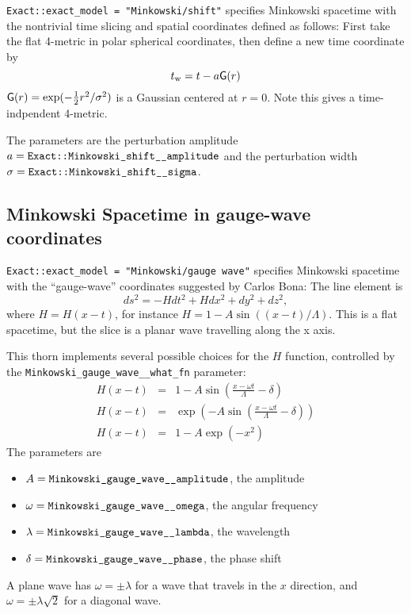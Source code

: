 \verb|Exact::exact_model = "Minkowski/shift"| specifies Minkowski spacetime
with the nontrivial time slicing and spatial coordinates defined as
follows:  First take the flat 4-metric in polar spherical coordinates,
then define a new time coordinate by
\begin{equation}
t_{{\rm w}} = t - a {\sf G}(r)
\end{equation}
${\sf G}(r) = \exp(-{\textstyle \frac{1}{2}} r^2/\sigma^2)$ is a Gaussian centered at $r=0$.
Note this gives a time-indpendent 4-metric.

The parameters are the perturbation amplitude
$a = \verb|Exact::Minkowski_shift__amplitude|$
and the perturbation width $\sigma = \verb|Exact::Minkowski_shift__sigma|$.


\subsection{Minkowski Spacetime in gauge-wave coordinates}

\verb|Exact::exact_model = "Minkowski/gauge wave"| specifies Minkowski
spacetime with the ``gauge-wave'' coordinates suggested by Carlos Bona:
The line element is
\begin{equation}
ds^2=-H dt^2 +Hdx^2+dy^2+dz^2,
\end{equation}
where $H=H(x-t)$, for instance $H=1-A\sin\left((x-t)/\Lambda\right)$.
This is a flat spacetime, but the slice is a planar wave travelling
along the x axis.

This thorn implements several possible choices for the $H$ function,
controlled by the \verb|Minkowski_gauge_wave__what_fn| parameter:
\begin{eqnarray}
H(x-t)	&=& 1 - A \sin \left(\frac{x-\omega t}{\Lambda} - \delta\right)	\\
H(x-t)	&=& \exp \left(- A \sin \left(\frac{x-\omega t}{\Lambda}
                                      - \delta\right)\right)		\\
H(x-t)	&=& 1 - A \exp(-x^2)						%
\end{eqnarray}
The parameters are
\begin{itemize}
\item	$A = \verb|Minkowski_gauge_wave__amplitude|$, the amplitude
\item	$\omega = \verb|Minkowski_gauge_wave__omega|$, the angular frequency
\item	$\lambda = \verb|Minkowski_gauge_wave__lambda|$, the wavelength
\item	$\delta = \verb|Minkowski_gauge_wave__phase|$, the phase shift
\end{itemize}
A plane wave has $\omega = \pm \lambda$ for a wave that travels in the
$x$ direction, and $\omega = \pm \lambda \sqrt{2}$ for a diagonal wave.

